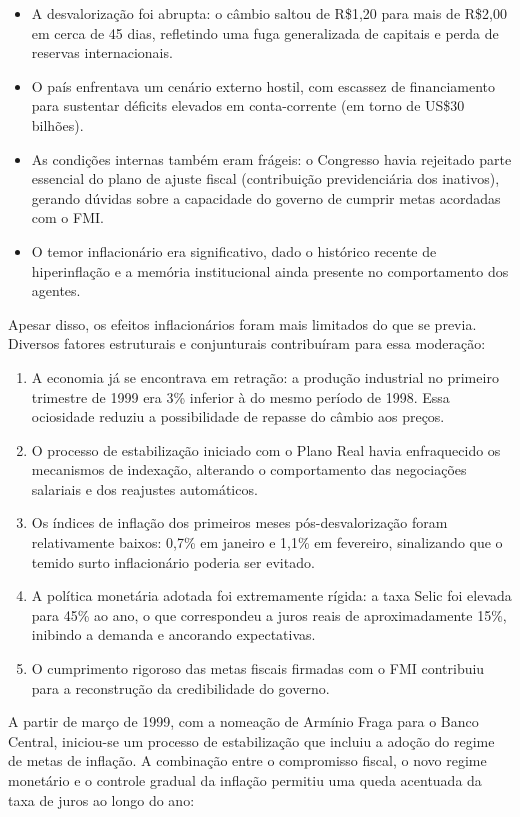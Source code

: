 \documentclass[a4paper,12pt]{article}[abntex2]
\begin{document}
\begin{itemize}
    \item A desvalorização foi abrupta: o câmbio saltou de R\$1,20 para mais de R\$2,00 em cerca de 45 dias, refletindo uma fuga generalizada de capitais e perda de reservas internacionais.
    \item O país enfrentava um cenário externo hostil, com escassez de financiamento para sustentar déficits elevados em conta-corrente (em torno de US\$30 bilhões).
    \item As condições internas também eram frágeis: o Congresso havia rejeitado parte essencial do plano de ajuste fiscal (contribuição previdenciária dos inativos), gerando dúvidas sobre a capacidade do governo de cumprir metas acordadas com o FMI.
    \item O temor inflacionário era significativo, dado o histórico recente de hiperinflação e a memória institucional ainda presente no comportamento dos agentes.
\end{itemize}

Apesar disso, os efeitos inflacionários foram mais limitados do que se previa. Diversos fatores estruturais e conjunturais contribuíram para essa moderação:

\begin{enumerate}
    \item A economia já se encontrava em retração: a produção industrial no primeiro trimestre de 1999 era 3\% inferior à do mesmo período de 1998. Essa ociosidade reduziu a possibilidade de repasse do câmbio aos preços.
    \item O processo de estabilização iniciado com o Plano Real havia enfraquecido os mecanismos de indexação, alterando o comportamento das negociações salariais e dos reajustes automáticos.
    \item Os índices de inflação dos primeiros meses pós-desvalorização foram relativamente baixos: 0,7\% em janeiro e 1,1\% em fevereiro, sinalizando que o temido surto inflacionário poderia ser evitado.
    \item A política monetária adotada foi extremamente rígida: a taxa Selic foi elevada para 45\% ao ano, o que correspondeu a juros reais de aproximadamente 15\%, inibindo a demanda e ancorando expectativas.
    \item O cumprimento rigoroso das metas fiscais firmadas com o FMI contribuiu para a reconstrução da credibilidade do governo.
\end{enumerate}

A partir de março de 1999, com a nomeação de Armínio Fraga para o Banco Central, iniciou-se um processo de estabilização que incluiu a adoção do regime de metas de inflação. A combinação entre o compromisso fiscal, o novo regime monetário e o controle gradual da inflação permitiu uma queda acentuada da taxa de juros ao longo do ano:
\end{document}
